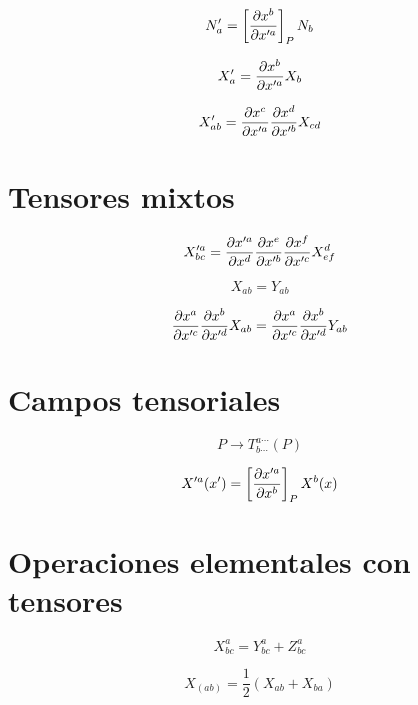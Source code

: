 \documentclass[../main]{subfiles}
\begin{document}
\begin{equation}
    N'_a=\left[ \pdv{x^b}{x'^a} \right]_P N_b   
\end{equation}

\begin{equation}
    X'_a=\pdv{x^b}{x'^a}X_b
\end{equation}

\begin{equation}
    X'_{ab}=\pdv{x^c}{x'^a} \pdv{x^d}{x'^b} X_{cd}
\end{equation}

\section{Tensores mixtos}

\begin{equation}
    X'^a_{bc}=\pdv{x'^a}{x^d} \pdv{x^e}{x'^b} \pdv{x^f}{x'^c} X^d_{ef}
\end{equation}

\begin{equation}
    X_{ab}=Y_{ab}
\end{equation}

\begin{equation*}
    \pdv{x^a}{x'^c} \pdv{x^b}{x'^d} X_{ab}= \pdv{x^a}{x'^c} \pdv{x^b}{x'^d} Y_{ab}
\end{equation*}

\section{Campos tensoriales}

\begin{equation*}
    P \rightarrow T_{b \cdots}^{a \cdots} (P)
\end{equation*}

\begin{equation}
    X'^a(x')=\left[ \pdv{x'^a}{x^b} \right]_P X^b(x)
\end{equation}

\section{Operaciones elementales con tensores}

\begin{equation}
    X_{bc}^a=Y^a_{bc}+Z^a_{bc}
\end{equation}

\begin{equation}
    X_{(ab)}=\dfrac{1}{2}(X_{ab}+X_{ba})
\end{equation}
\end{document}

